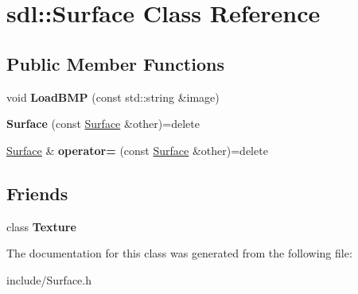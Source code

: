 \hypertarget{classsdl_1_1Surface}{\section{sdl\-:\-:Surface Class Reference}
\label{classsdl_1_1Surface}
}
\subsection*{Public Member Functions}
\begin{DoxyCompactItemize}
\item 
\hypertarget{classsdl_1_1Surface_af142827af0efa4a0dedfe4116d19a7a6}{void {\bfseries Load\-B\-M\-P} (const std\-::string \&image)}\label{classsdl_1_1Surface_af142827af0efa4a0dedfe4116d19a7a6}

\item 
\hypertarget{classsdl_1_1Surface_a9e6ae2a781680e9acefe8cf72ebe6fc9}{{\bfseries Surface} (const \hyperlink{classsdl_1_1Surface}{Surface} \&other)=delete}\label{classsdl_1_1Surface_a9e6ae2a781680e9acefe8cf72ebe6fc9}

\item 
\hypertarget{classsdl_1_1Surface_a316b3db70ebb93584204658fbc715996}{\hyperlink{classsdl_1_1Surface}{Surface} \& {\bfseries operator=} (const \hyperlink{classsdl_1_1Surface}{Surface} \&other)=delete}\label{classsdl_1_1Surface_a316b3db70ebb93584204658fbc715996}

\end{DoxyCompactItemize}
\subsection*{Friends}
\begin{DoxyCompactItemize}
\item 
\hypertarget{classsdl_1_1Surface_af7f909106d08e36cd50aa58e36f9bf47}{class {\bfseries Texture}}\label{classsdl_1_1Surface_af7f909106d08e36cd50aa58e36f9bf47}

\end{DoxyCompactItemize}


The documentation for this class was generated from the following file\-:\begin{DoxyCompactItemize}
\item 
include/Surface.\-h\end{DoxyCompactItemize}
